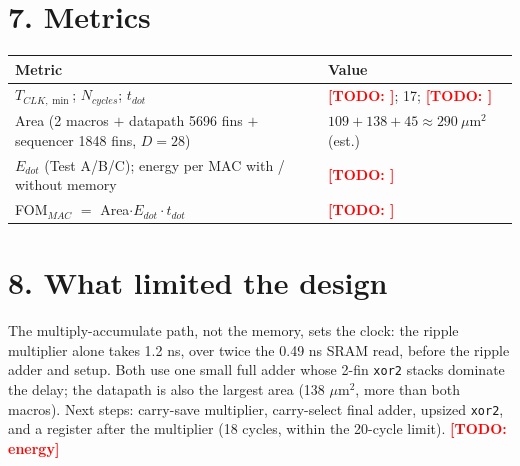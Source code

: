\documentclass[10pt,letterpaper]{article}
\newcommand{\todo}[1]{\textcolor{red}{\textbf{[TODO: #1]}}}
\newcommand{\code}[1]{\texttt{#1}}
\begin{document}
\section*{7. Metrics}
\begin{center}\small\begin{tabular}{@{}ll@{}}\toprule Metric & Value\\\midrule
$T_{CLK,\min}$; $N_{cycles}$; $t_{dot}$ & \todo{}; 17; \todo{}\\
Area (2 macros $+$ datapath 5696 fins $+$ sequencer 1848 fins, $D=28$) & $109+138+45\approx290\ \mu$m$^2$ (est.)\\
$E_{dot}$ (Test A/B/C); energy per MAC with / without memory & \todo{}\\
FOM$_{MAC}$ $=$ Area$\cdot E_{dot}\cdot t_{dot}$ & \todo{}\\\bottomrule\end{tabular}\end{center}

\section*{8. What limited the design}
The multiply-accumulate path, not the memory, sets the clock: the ripple multiplier alone takes 1.2 ns, over twice the 0.49 ns SRAM read, before the ripple adder and setup. Both use one small full adder whose 2-fin \code{xor2} stacks dominate the delay; the datapath is also the largest area (138 $\mu$m$^2$, more than both macros). Next steps: carry-save multiplier, carry-select final adder, upsized \code{xor2}, and a register after the multiplier (18 cycles, within the 20-cycle limit). \todo{energy}
\end{document}
